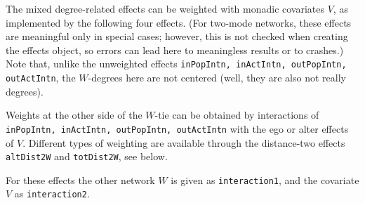\documentclass[a4paper,fleqn,11pt]{article}
\newcommand{\+}{\, + \,}
\begin{document}
\noindent
The mixed degree-related effects can be weighted with monadic covariates $V$,
as implemented by the following four effects.
(For two-mode networks, these effects are meaningful only in special cases;
however, this is not checked when creating the effects object, so errors
can lead here to meaningless results or to crashes.)
Note that, unlike the unweighted effects
\texttt{inPopIntn, inActIntn, outPopIntn, outActIntn}, the $W$-degrees
here are not centered (well, they are also not really degrees).

Weights at the other side of the $W$-tie can be obtained by interactions of
\texttt{inPopIntn, inActIntn, outPopIntn, outActIntn} with the ego or
alter effects of $V$.
Different types of weighting are available through the distance-two
effects \texttt{altDist2W} and \texttt{totDist2W}, see below.

For these effects the other network $W$ is given as \texttt{interaction1},
and the covariate $V$ as \texttt{interaction2}.
\end{document}
